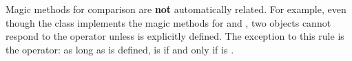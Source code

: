 \begin{warn}
Magic methods for comparison are \textbf{not} automatically related.
For example, even though the  class implements the magic methods for \li{<} and \li{==}, two  objects cannot respond to the \li{<=} operator unless  is explicitly defined.
The exception to this rule is the \li{\!=} operator: as long as  is defined,  is  if and only if  is .
\end{warn}

